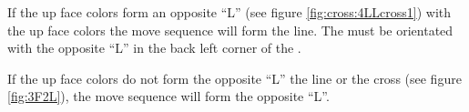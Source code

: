 \begin{figure}[htb]
	\centering
		\hspace{0.02\textwidth}
		\hspace{0.02\textwidth}
		\caption{}
		\label{fig:cross}
\end{figure}

If the up face colors form an opposite ``L'' (see figure \ref{fig:cross:4LLcross1}) with the up face colors the move sequence will form the line. 
The \cube{} must be orientated with the opposite ``L'' in the back left corner of the \cube{}. 

If the up face colors do not form the opposite ``L'' the line or the cross (see figure \ref{fig:3F2L}), the move sequence will form the opposite ``L''.

